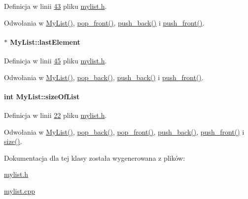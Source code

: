 Definicja w linii \hyperlink{mylist_8h_source_l00043}{43} pliku \hyperlink{mylist_8h_source}{mylist.\-h}.



Odwołania w \hyperlink{mylist_8cpp_source_l00011}{My\-List()}, \hyperlink{mylist_8cpp_source_l00046}{pop\-\_\-front()}, \hyperlink{mylist_8cpp_source_l00018}{push\-\_\-back()} i \hyperlink{mylist_8cpp_source_l00027}{push\-\_\-front()}.

\hypertarget{class_my_list_a287894c4add6b52be99826fb4d76594c}{
\paragraph[{last\-Element}]{$\ast$ My\-List\-::last\-Element\hspace{0.3cm}{\ttfamily [private]}}}\label{class_my_list_a287894c4add6b52be99826fb4d76594c}


Definicja w linii \hyperlink{mylist_8h_source_l00045}{45} pliku \hyperlink{mylist_8h_source}{mylist.\-h}.



Odwołania w \hyperlink{mylist_8cpp_source_l00011}{My\-List()}, \hyperlink{mylist_8cpp_source_l00037}{pop\-\_\-back()}, \hyperlink{mylist_8cpp_source_l00018}{push\-\_\-back()} i \hyperlink{mylist_8cpp_source_l00027}{push\-\_\-front()}.

\hypertarget{class_my_list_a77b7870f617b51fad7399463c9147668}{
\paragraph[{size\-Of\-List}]{\setlength{\rightskip}{0pt plus 5cm}int My\-List\-::size\-Of\-List\hspace{0.3cm}{\ttfamily [private]}}}\label{class_my_list_a77b7870f617b51fad7399463c9147668}


Definicja w linii \hyperlink{mylist_8h_source_l00022}{22} pliku \hyperlink{mylist_8h_source}{mylist.\-h}.



Odwołania w \hyperlink{mylist_8cpp_source_l00011}{My\-List()}, \hyperlink{mylist_8cpp_source_l00037}{pop\-\_\-back()}, \hyperlink{mylist_8cpp_source_l00046}{pop\-\_\-front()}, \hyperlink{mylist_8cpp_source_l00018}{push\-\_\-back()}, \hyperlink{mylist_8cpp_source_l00027}{push\-\_\-front()} i \hyperlink{mylist_8cpp_source_l00070}{size()}.



Dokumentacja dla tej klasy została wygenerowana z plików\-:\begin{DoxyCompactItemize}
\item 
\hyperlink{mylist_8h}{mylist.\-h}\item 
\hyperlink{mylist_8cpp}{mylist.\-cpp}\end{DoxyCompactItemize}
